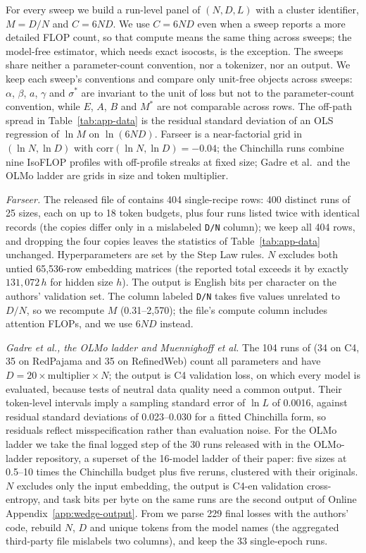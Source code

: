 For every sweep we build a run-level panel of $(N,D,L)$ with a cluster identifier, $M=D/N$ and $C=6ND$. We use $C=6ND$
even when a sweep reports a more detailed FLOP count, so that compute means the same thing across sweeps; the model-free
estimator, which needs exact isocosts, is the exception. The sweeps share neither a parameter-count convention, nor a
tokenizer, nor an output. We keep each sweep's conventions and compare only unit-free
objects across sweeps: $\alpha$, $\beta$, $a$, $\gamma$ and $\sigma^*$ are invariant to the unit of loss but not to the
parameter-count convention, while $E$, $A$, $B$ and $M^*$ are not comparable across rows. The off-path spread in
Table~\ref{tab:app-data} is the residual standard deviation of an OLS regression of $\ln M$ on $\ln(6ND)$. Farseer is a
near-factorial grid in $(\ln N,\ln D)$ with $\mathrm{corr}(\ln N,\ln D)=-0.04$; the Chinchilla runs combine nine IsoFLOP
profiles with off-profile streaks at fixed size; Gadre et al.\ and the OLMo ladder are grids in size and token multiplier.

\textit{Farseer.} The released file of \citet{li2025predictableb} contains 404 single-recipe rows: 400 distinct runs of
25 sizes, each on up to 18 token budgets, plus four runs listed twice with identical records (the copies differ only in
a mislabeled \texttt{D/N} column); we keep all 404 rows, and dropping the four copies leaves the statistics of
Table~\ref{tab:app-data} unchanged. Hyperparameters are set by the Step Law rules. $N$ excludes both untied 65,536-row embedding matrices (the reported total
exceeds it by exactly $131{,}072\,h$ for hidden size $h$). The output is English bits per character on the authors'
validation set. The column labeled \texttt{D/N} takes five values unrelated to $D/N$, so we recompute $M$ (0.31--2,570);
the file's compute column includes attention FLOPs, and we use $6ND$ instead.

\textit{Gadre et al., the OLMo ladder and Muennighoff et al.} The 104 runs of \citet{gadre2024language} (34 on C4, 35 on
RedPajama and 35 on RefinedWeb) count all parameters and have $D=20\times\text{multiplier}\times N$; the output is C4
validation loss, on which every model is evaluated, because tests of neutral data quality need a common output. Their
token-level intervals imply a sampling standard error of $\ln L$ of 0.0016, against residual standard deviations of
0.023--0.030 for a fitted Chinchilla form, so residuals reflect misspecification rather than evaluation noise. For the
OLMo ladder we take the final logged step of the 30 runs released with \citet{bhagia2024establishing} in the OLMo-ladder
repository, a superset of the 16-model ladder of their paper: five sizes at 0.5--10 times the Chinchilla budget plus
five reruns, clustered with their originals. $N$ excludes only the input embedding, the output is
C4-en validation cross-entropy, and task bits per byte on the same runs are the second output of Online
Appendix~\ref{app:wedge-output}. From \citet{muennighoff2023scaling} we parse 229 final losses with the authors' code,
rebuild $N$, $D$ and unique tokens from the model names (the aggregated third-party file mislabels two columns), and
keep the 33 single-epoch runs.

